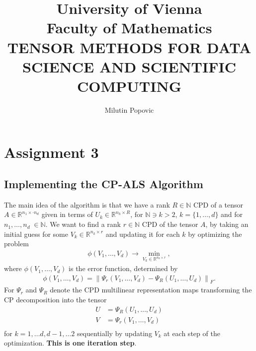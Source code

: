 \documentclass[a4paper]{article}
\title{University of Vienna\\ Faculty of Mathematics\\
\vspace{1cm}TENSOR METHODS FOR DATA SCIENCE AND SCIENTIFIC COMPUTING
}
\author{Milutin Popovic}
\begin{document}
\maketitle
\tableofcontents
\section{Assignment 3}
\subsection{Implementing the CP-ALS Algorithm}
The main idea of the algorithm is that we have a rank $R\in \mathbb{N}$ CPD
of a tensor $A \in \mathbb{R}^{n_1 \times \cdot n_d}$ given in terms of
$U_k \in \mathbb{R}^{n_k \times R}$, for $\mathbb{N}\ni k>2$, $k =
\{1,\dots,d\}$ and for $n_1, \dots, n_d\; \in \mathbb{N}$. We want to find a
rank $r\in \mathbb{N}$ CPD of the tensor $A$, by taking an initial guess
for some $V_k \in \mathbb{R}^{n_k \times r}$ and updating it for each $k$ by
optimizing the problem
\begin{align}
    \phi(V_1, \dots, V_d) \rightarrow \min_{V_k \in \mathbb{R}^{n_k\times
    r}},
\end{align}
where $\phi(V_1, \dots, V_d)$ is the error function, determined by
\begin{align}
    \phi(V_1, \dots, V_d) = \left\|\Psi_r(V_1,\dots,V_d) - \Psi_R(U_1,
    \dots,U_d) \right\|_F .
\end{align}
For $\Psi_r$ and $\Psi_R$ denote the CPD multilinear representation maps
transforming the CP decomposition into the tensor
\begin{align}
    U &= \Psi_R(U_1, \dots, U_d)\\
    V &= \Psi_r(V_1, \dots, V_d)\\
 \end{align}
for $k = 1, \dots d, d-1, \dots 2$ sequentially by updating $V_k$ at each
step of the optimization. \textbf{This is one iteration step}.
\end{document}
